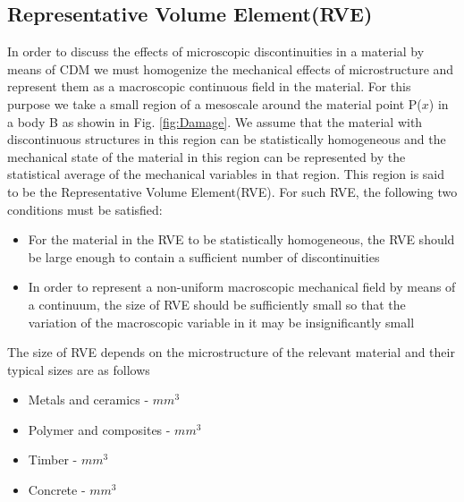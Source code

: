 \documentclass[a4paper,12pt]{article}
\begin{document}
\subsection{Representative Volume Element(RVE)}
\indent\indent\indent  In order to discuss the effects of microscopic discontinuities in  a material by means of CDM we must homogenize the mechanical effects of microstructure and represent them as a macroscopic continuous field in the material. For this purpose we take a small region of a mesoscale around the material point P($x$) in a body B as showin in Fig. \ref{fig:Damage}. We assume that the  material with discontinuous structures in this region can be statistically homogeneous and the mechanical state of the material in this region can be represented by the statistical average of the mechanical variables in that region. This region is said to be the Representative Volume Element(RVE). For such RVE, the following two conditions must be satisfied:
\begin{itemize}
\item  For the material in the RVE to be statistically homogeneous, the RVE should be large enough to contain a sufficient number of discontinuities
\item In order to represent a non-uniform macroscopic mechanical field by means of a continuum, the size of RVE should be sufficiently small so that the variation of the macroscopic variable in it may be insignificantly small
\end{itemize}
The size of RVE depends on the microstructure of the relevant material and their typical sizes are as follows
\begin{itemize}
\item Metals and ceramics  \;    -    $mm^3$
\item Polymer and composites \;   -   $mm^3$
\item Timber\; - $mm^3$
\item Concrete \; - $mm^3$
\end{itemize}
\newpage
\end{document}
